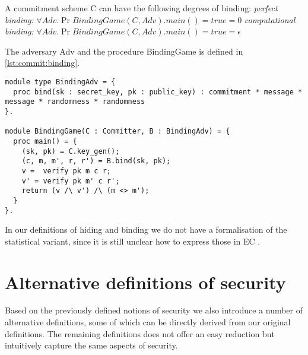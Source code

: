 \begin{definition}[Binding]
  \label{def:commitment:binding}
  A commitment scheme C can have the following degrees of binding:
  \textit{perfect binding:} $\forall Adv. \Pr{BindingGame(C, Adv).main() = true} = 0$
  \textit{computational binding:} $\forall Adv. \Pr{BindingGame(C, Adv).main() = true} = \epsilon$

  The adversary Adv and the procedure BindingGame is defined in \autoref{lst:commit:binding}.
\begin{lstlisting}[label=lst:commit:binding, float, caption=Binding Game]
module type BindingAdv = {
  proc bind(sk : secret_key, pk : public_key) : commitment * message * message * randomness * randomness
}.

module BindingGame(C : Committer, B : BindingAdv) = {
  proc main() = {
    (sk, pk) = C.key_gen();
    (c, m, m', r, r') = B.bind(sk, pk);
    v =  verify pk m c r;
    v' = verify pk m' c r';
    return (v /\ v') /\ (m <> m');
  }
}.

\end{lstlisting}
\end{definition}

In our definitions of hiding and binding we do not have a formalisation of the
statistical variant, since it is still unclear how to express those in EC \cite{ec_intro}.


\section{Alternative definitions of security}
\label{sec:commitment:alt-sec}
Based on the previously defined notions of security we also introduce a number
of alternative definitions, some of which can be directly derived from our
original definitions. The remaining definitions does not offer an easy reduction but
intuitively capture the same aspects of security.

